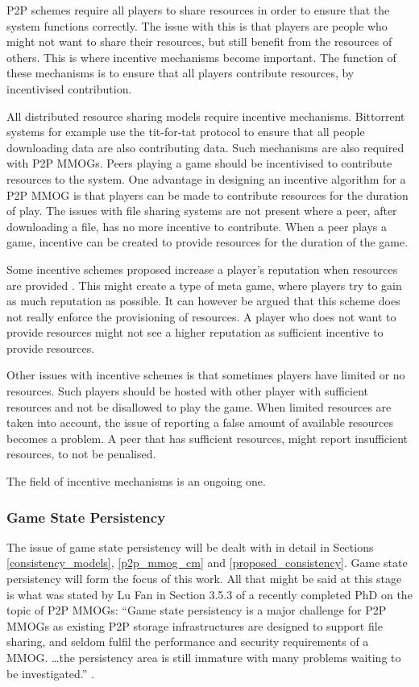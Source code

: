 \documentclass[journal,oneside,a4paper,onecolumn]{IEEEtran}
\begin{document}
P2P schemes require all players to share resources in order to ensure that the system functions correctly. The issue with this is that players are people who might not want to share their resources, but still benefit from the resources of others. This is where incentive mechanisms become important. The function of these mechanisms is to ensure that all players contribute resources, by incentivised contribution.

All distributed resource sharing models require incentive mechanisms. Bittorrent systems for example use the tit-for-tat protocol \cite{tit_for_tat} to ensure that all people downloading data are also contributing data. Such mechanisms are also required with P2P MMOGs. Peers playing a game should be incentivised to contribute resources to the system. One advantage in designing an incentive algorithm for a P2P MMOG is that players can be made to contribute resources for the duration of play. The issues with file sharing systems are not present where a peer, after downloading a file, has no more incentive to contribute. When a peer plays a game, incentive can be created to provide resources for the duration of the game.

Some incentive schemes proposed increase a player's reputation when resources are provided \cite{classic_p2p_reputation} \cite{proactive_reputation}. This might create a type of meta game, where players try to gain as much reputation as possible. It can however be argued that this scheme does not really enforce the provisioning of resources. A player who does not want to provide resources might not see a higher reputation as sufficient incentive to provide resources.

Other issues with incentive schemes is that sometimes players have limited or no resources. Such players should be hosted with other player with sufficient resources and not be disallowed to play the game. When limited resources are taken into account, the issue of reporting a false amount of available resources becomes a problem. A peer that has sufficient resources, might report insufficient resources, to not be penalised.

The field of incentive mechanisms is an ongoing one.

\subsubsection{Game State Persistency}

The issue of game state persistency will be dealt with in detail in Sections \ref{consistency_models}, \ref{p2p_mmog_cm} and \ref{proposed_consistency}. Game state persistency will form the focus of this work. All that might be said at this stage is what was stated by Lu Fan in Section 3.5.3 of a recently completed PhD on the topic of P2P MMOGs: ``Game state persistency is a major challenge for P2P MMOGs as existing P2P storage infrastructures are designed to support file sharing, and seldom fulfil the performance and security requirements of a MMOG. \ldots the persistency area is still immature with many problems waiting to be investigated.'' \cite{Fan_phd}.
\end{document}
